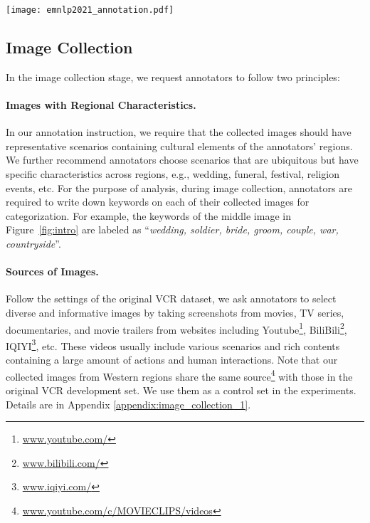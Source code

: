 \documentclass[11pt]{article}
\begin{document}
\begin{figure*}[t]
    \centering
    \texttt{[image: emnlp2021\_annotation.pdf]}
    \caption{Overall annotation pipeline. It is divided into three stages: Stage 1 is to collect images with regional characteristics; Stage 2 is to design QA pairs based on the detected objects; Stage 3 is to generate answer candidates to complete the dataset with the help of the answer choices in the original VCR development set.}
    \label{fig:annotation}
\end{figure*}

\subsection{Image Collection}
\label{sec:image_collection}
In the image collection stage, we request annotators to follow two principles:
\paragraph{Images with Regional Characteristics.} In our annotation instruction, we require that the collected images should have representative scenarios containing cultural elements of the annotators' regions. We further recommend annotators choose scenarios that are ubiquitous but have specific characteristics across regions, e.g., wedding, funeral, festival, religion events, etc. 
For the purpose of analysis, during image collection, annotators are required to write down keywords on each of their collected images for categorization. For example, the keywords of the middle image in Figure~\ref{fig:intro} are labeled as ``\textit{wedding, soldier, bride, groom, couple, war, countryside}''.

\paragraph{Sources of Images.} Follow the settings of the original VCR dataset, we ask annotators to select diverse and informative images by taking screenshots from movies, TV series, documentaries, and movie trailers from websites including Youtube\footnote{\url{www.youtube.com/}}, BiliBili\footnote{\url{www.bilibili.com/}}, IQIYI\footnote{\url{www.iqiyi.com/}}, etc. These videos usually include various scenarios and rich contents containing a large amount of actions and human interactions. Note that our collected images from Western regions share the same source\footnote{\url{www.youtube.com/c/MOVIECLIPS/videos}} with those in the original VCR development set.
We use them as a control set in the experiments. 
Details are in Appendix \ref{appendix:image_collection_1}.
\end{document}
